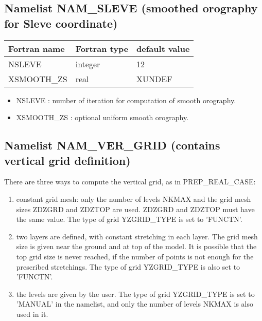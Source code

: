 \subsection{Namelist NAM\_SLEVE (smoothed orography for Sleve coordinate) }

\begin{center}
\begin{tabular} {|l|l|l|}
\hline
Fortran name & Fortran type & default value \\
\hline
NSLEVE  & integer & 12   \\  
XSMOOTH\_ZS & real & XUNDEF  \\
\hline
\end{tabular}
\end{center}

\begin{itemize}
\item NSLEVE :
 number of iteration for computation of smooth orography.
\item XSMOOTH\_ZS :
 optional uniform smooth orography.
\end{itemize}


  


            
\subsection{Namelist NAM\_VER\_GRID (contains vertical grid definition)}

There are three ways to compute the vertical grid, as in PREP\_REAL\_CASE:
\begin{enumerate}
\item
constant grid mesh: only the number of levels NKMAX and the grid mesh sizes 
ZDZGRD and ZDZTOP are used. ZDZGRD and ZDZTOP must have the same value. The type of grid 
YZGRID\_TYPE is set to 'FUNCTN'.
\item
two layers are defined, with constant stretching in each layer. The grid
mesh size is given near the ground and at top of the model. It is possible
that the top grid size is never reached, if the number of points is not enough
for the prescribed stretchings. The type of grid 
YZGRID\_TYPE is also set to 'FUNCTN'.
\item
the levels are given by the user. The type of grid YZGRID\_TYPE is set to
'MANUAL' in the namelist, and only the number of levels NKMAX is also used in it. 
\end{enumerate}

